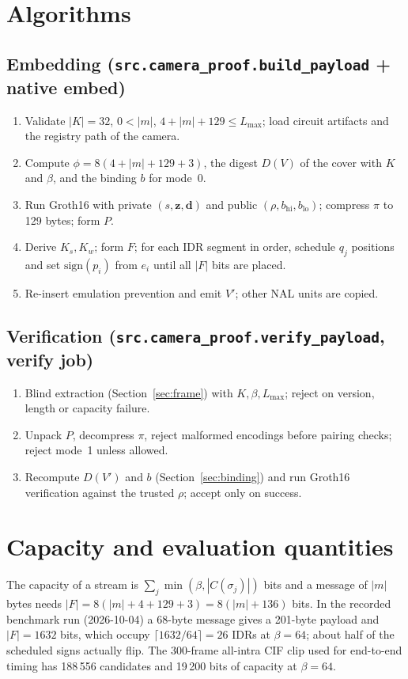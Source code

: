 \documentclass[11pt,a4paper]{article}
\theoremstyle{definition}
\theoremstyle{remark}
\begin{document}
\section{Algorithms}
\subsection*{Embedding (\texttt{src.camera\_proof.build\_payload} + native embed)}
\begin{enumerate}
\item Validate $|K|=32$, $0<|m|$, $4+|m|+129\le L_{\max}$; load circuit
artifacts and the registry path of the camera.
\item Compute $\phi=8(4+|m|+129+3)$, the digest $D(V)$ of the cover with $K$ and
$\beta$, and the binding $b$ for mode~$0$.
\item Run Groth16 with private $(s,\mathbf{z},\mathbf{d})$ and public
$(\rho,b_{\mathrm{hi}},b_{\mathrm{lo}})$; compress $\pi$ to 129 bytes; form $P$.
\item Derive $K_s,K_w$; form $F$; for each IDR segment in order, schedule $q_j$
positions and set $\text{sign}(p_i)$ from $e_i$ until all $|F|$ bits are placed.
\item Re-insert emulation prevention and emit $V'$; other NAL units are copied.
\end{enumerate}
\subsection*{Verification (\texttt{src.camera\_proof.verify\_payload}, verify job)}
\begin{enumerate}
\item Blind extraction (Section~\ref{sec:frame}) with $K,\beta,L_{\max}$; reject
on version, length or capacity failure.
\item Unpack $P$, decompress $\pi$, reject malformed encodings before pairing
checks; reject mode~1 unless allowed.
\item Recompute $D(V')$ and $b$ (Section~\ref{sec:binding}) and run Groth16
verification against the trusted $\rho$; accept only on success.
\end{enumerate}

\section{Capacity and evaluation quantities}
The capacity of a stream is $\sum_j\min(\beta,|C(\sigma_j)|)$ bits and a
message of $|m|$ bytes needs $|F|=8(|m|+4+129+3)=8(|m|+136)$ bits. In the
recorded benchmark run (2026-10-04) a 68-byte message gives a 201-byte payload
and $|F|=1632$ bits, which occupy $\lceil1632/64\rceil=26$ IDRs at $\beta=64$;
about half of the scheduled signs actually flip. The 300-frame all-intra CIF
clip used for end-to-end timing has 188\,556 candidates and 19\,200 bits of
capacity at $\beta=64$.
\end{document}

